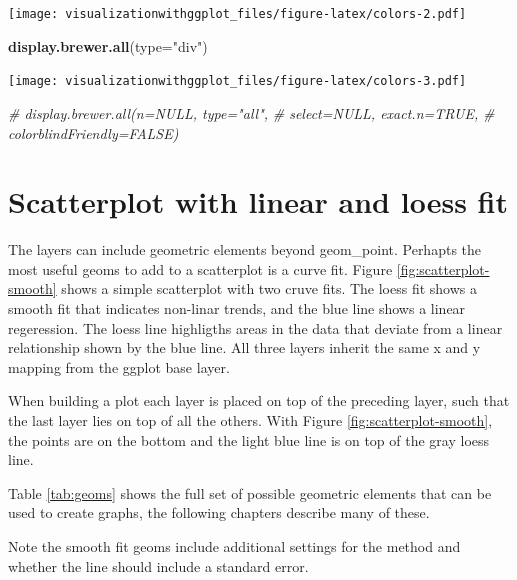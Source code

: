 \documentclass[]{krantz}
\makeatletter
\newenvironment{Shaded}{\begin{snugshade}}{\end{snugshade}}
\newcommand{\CommentTok}[1]{\textcolor[rgb]{0.56,0.35,0.01}{\textit{#1}}}
\newcommand{\DataTypeTok}[1]{\textcolor[rgb]{0.13,0.29,0.53}{#1}}
\newcommand{\KeywordTok}[1]{\textcolor[rgb]{0.13,0.29,0.53}{\textbf{#1}}}
\newcommand{\NormalTok}[1]{#1}
\newcommand{\StringTok}[1]{\textcolor[rgb]{0.31,0.60,0.02}{#1}}
\newenvironment{kframe}{%
\medskip{}
\setlength{\fboxsep}{.8em}
 \def\at@end@of@kframe{}%
 \ifinner\ifhmode%
  \def\at@end@of@kframe{\end{minipage}}%
  \begin{minipage}{\columnwidth}%
 \fi\fi%
 \def\FrameCommand##1{\hskip\@totalleftmargin \hskip-\fboxsep
 \colorbox{shadecolor}{##1}\hskip-\fboxsep
     \hskip-\linewidth \hskip-\@totalleftmargin \hskip\columnwidth}%
 \MakeFramed {\advance\hsize-\width
   \@totalleftmargin\z@ \linewidth\hsize
   \@setminipage}}%
 {\par\unskip\endMakeFramed%
 \at@end@of@kframe}
\renewenvironment{Shaded}{\begin{kframe}}{\end{kframe}}
\makeatother
\begin{document}
\texttt{[image: visualizationwithggplot\_files/figure-latex/colors-2.pdf]}

\begin{Shaded}
\begin{Highlighting}[]
\KeywordTok{display.brewer.all}\NormalTok{(}\DataTypeTok{type=}\StringTok{"div"}\NormalTok{)}
\end{Highlighting}
\end{Shaded}

\texttt{[image: visualizationwithggplot\_files/figure-latex/colors-3.pdf]}

\begin{Shaded}
\begin{Highlighting}[]
\CommentTok{# display.brewer.all(n=NULL, type="all", }
\CommentTok{#                    select=NULL, exact.n=TRUE, }
\CommentTok{#                    colorblindFriendly=FALSE)}
\end{Highlighting}
\end{Shaded}

\hypertarget{scatterplot-with-linear-and-loess-fit}{%
\section{Scatterplot with linear and loess fit}\label{scatterplot-with-linear-and-loess-fit}}

The layers can include geometric elements beyond geom\_point. Perhapts the most useful geoms to add to a scatterplot is a curve fit. Figure \ref{fig:scatterplot-smooth} shows a simple scatterplot with two cruve fits. The loess fit shows a smooth fit that indicates non-linar trends, and the blue line shows a linear regeression. The loess line highligths areas in the data that deviate from a linear relationship shown by the blue line. All three layers inherit the same x and y mapping from the ggplot base layer.

When building a plot each layer is placed on top of the preceding layer, such that the last layer lies on top of all the others. With Figure \ref{fig:scatterplot-smooth}, the points are on the bottom and the light blue line is on top of the gray loess line.

Table \ref{tab:geoms} shows the full set of possible geometric elements that can be used to create graphs, the following chapters describe many of these.

Note the smooth fit geoms include additional settings for the method and whether the line should include a standard error.
\end{document}
